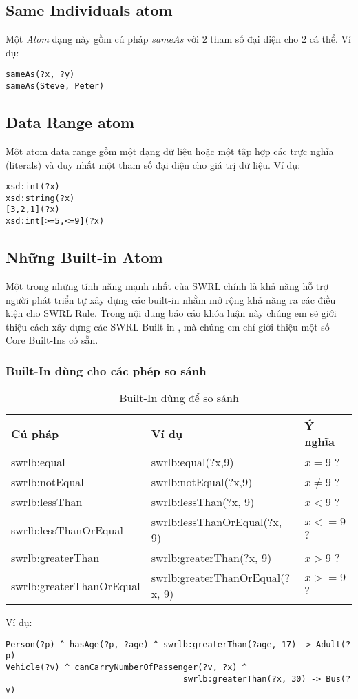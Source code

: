 \subsection{Same Individuals atom}
Một \textit{Atom} dạng này gồm cú pháp \textit{sameAs} với 2 tham số đại diện cho 2 cá thể. Ví dụ:
\begin{verbatim}
sameAs(?x, ?y)
sameAs(Steve, Peter)
\end{verbatim}

\subsection{Data Range atom}
Một atom data range gồm một dạng dữ liệu hoặc một tập hợp các trực nghĩa (literals) và duy nhất một tham số đại diện cho giá trị dữ liệu. Ví dụ:
\begin{verbatim}
xsd:int(?x)
xsd:string(?x)
[3,2,1](?x)
xsd:int[>=5,<=9](?x)
\end{verbatim}

\subsection{Những Built-in Atom}
Một trong những tính năng mạnh nhất của SWRL chính là khả năng hỗ trợ người phát triển tự xây dựng các built-in nhằm mở rộng khả năng ra các điều kiện cho SWRL Rule. Trong nội dung báo cáo khóa luận này chúng em sẽ giới thiệu cách xây dựng các SWRL Built-in \cite{swrlbuiltin}, mà chúng em chỉ giới thiệu một số Core Built-Ins \cite{swrlcorebuiltin} có sẵn.
\subsubsection{Built-In dùng cho các phép so sánh}
\begin{table}[!h]
	\centering
	\begin{tabular}{|l|l|l|}
		\hline
		Cú pháp & Ví dụ & Ý nghĩa \\ 
		\hline
		swrlb:equal & swrlb:equal(?x,9) & $x = 9$  ? \\		
		\hline
		swrlb:notEqual & swrlb:notEqual(?x,9) & $x \neq 9$  ? \\		
		\hline
		swrlb:lessThan & swrlb:lessThan(?x, 9) & $x < 9$ ? \\
		\hline
		swrlb:lessThanOrEqual & swrlb:lessThanOrEqual(?x, 9) & $x <= 9$ ? \\
		\hline
		swrlb:greaterThan & swrlb:greaterThan(?x, 9) & $x > 9$ ? \\
		\hline
		swrlb:greaterThanOrEqual & swrlb:greaterThanOrEqual(?x, 9) & $x >= 9$ ? \\
		\hline
	\end{tabular}
\caption{Built-In dùng để so sánh\label{overflow}}
\end{table}
Ví dụ:
\begin{verbatim}
Person(?p) ^ hasAge(?p, ?age) ^ swrlb:greaterThan(?age, 17) -> Adult(?p)
Vehicle(?v) ^ canCarryNumberOfPassenger(?v, ?x) ^ 
									swrlb:greaterThan(?x, 30) -> Bus(?v)

\end{verbatim}



